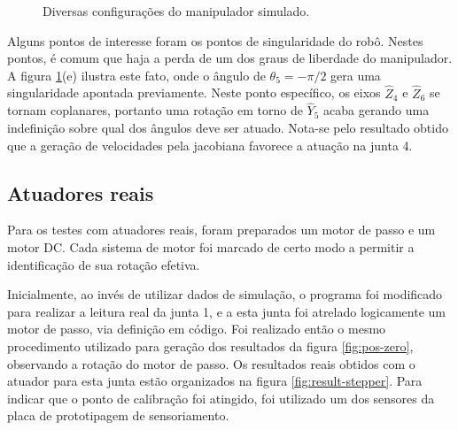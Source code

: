 \begin{figure}[h!]
\begin{centering}
\begin{floatrow}
    \end{floatrow}


\caption{Diversas configurações do manipulador simulado.}
\label{fig:pos-varias}

\par\end{centering}
\end{figure}

Alguns pontos de interesse foram os pontos de singularidade do robô. Nestes pontos, é comum
que haja a perda de um dos graus de liberdade do manipulador. A figura \ref{fig:pos-varias}(e) 
ilustra este fato, onde o ângulo de $\theta_5 = -\pi/2$ gera uma singularidade apontada previamente.
Neste ponto específico, os eixos $\hat{Z}_4$ e $\hat{Z}_6$ se tornam coplanares, portanto uma 
rotação em torno de $\hat{Y}_5$ acaba gerando uma indefinição sobre qual dos ângulos deve ser
atuado. Nota-se pelo resultado obtido que a geração de velocidades pela jacobiana favorece a atuação
na junta 4.

\subsection{Atuadores reais}

Para os testes com atuadores reais, foram preparados um motor de passo e um motor DC. Cada
sistema de motor foi marcado de certo modo a permitir a identificação de sua rotação efetiva. 

Inicialmente, ao invés de utilizar dados de simulação, o programa foi modificado para realizar 
a leitura real da junta 1, e a esta junta foi atrelado logicamente um motor de passo, via definição em código. 
Foi realizado então o mesmo procedimento utilizado para geração dos resultados da figura 
\ref{fig:pos-zero}, observando a rotação do motor de passo. Os resultados reais obtidos 
com o atuador para esta junta estão organizados na figura \ref{fig:result-stepper}.
Para indicar que o ponto de calibração foi atingido, foi utilizado um dos sensores da placa 
de prototipagem de sensoriamento.

